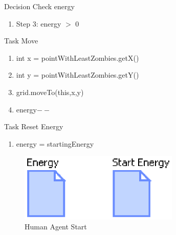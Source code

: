 \documentclass[11pt]{amsart}
\begin{document}
Decision Check energy
\begin{enumerate}
 \item Step 3: energy $>$ 0
\end{enumerate}

Task Move
\begin{enumerate}
 \item int x = pointWithLeastZombies.getX()
 \item int y = pointWithLeastZombies.getY()
 \item grid.moveTo(this,x,y)
 \item energy$--$
\end{enumerate}

Task Reset Energy
\begin{enumerate}
 \item energy = startingEnergy
\end{enumerate}


\begin{figure}[p]
\begin{center}
\vspace{.2in}
\centerline {
\includegraphics[width=3in]{figs/Human_start.eps}
}
\caption{Human Agent Start}
\label{fig:humanstart}
\end{center}\end{figure}
\end{document}
